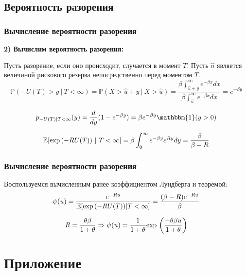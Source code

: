 \documentclass[10pt]{beamer}
\newcommand\Exp{{\rm exp \,}}
\begin{document}
\subsection{Вероятность разорения}
\begin{frame}
\frametitle{Вычисление вероятности разорения}
\textbf{2) Вычислим вероятность разорения:}

Пусть разорение, если оно происходит, случается в момент $T$.
Пусть $\hat{u}$ является величиной рискового резерва непосредственно перед моментом $T$.
\begin{equation}
\mathbb{P}(-U(T)>y\ |\ T < \infty) = \mathbb{P}(X > \hat{u} + y \ | \ X > \hat{u}) =
\frac   {\beta\int_{\hat{u}+y}^{\infty} e^{-\beta x}dx}
        {\beta\int_{\hat{u}}^{\infty}   e^{-\beta x}dx}
                                                        = e^{-\beta y}
\end{equation}

\begin{equation}
p_{-U(T)|T < \infty}(y) = \frac{d}{dy}(1-e^{-\beta y}) = \beta e^{-\beta y} \mathbbm{1}(y > 0)
\end{equation}

\begin{equation}
\mathbb{E}[\Exp(-RU(T)) \ | \ T<\infty] = \beta\int_{0}^{\infty} e^{-\beta y} e^{Ry}dy =
\frac{\beta}{\beta - R}
\end{equation}
\end{frame}


\begin{frame}
\frametitle{Вычисление вероятности разорения}

Воспользуемся вычисленным ранее коэффициентом Лундберга и теоремой:
\begin{equation}
\psi(u) = \frac{e^{-Ru}}{\mathbb{E}[\Exp(-RU(T))|T < \infty]} = \frac{(\beta-R)e^{-Ru}}{\beta}
\end{equation}

\begin{equation}
R = \frac{\theta\beta}{1 + \theta} \Rightarrow
\psi(u) = \frac{1}{1+\theta} \Exp\left(\frac{-\theta\beta u}{1+\theta}\right)
\end{equation}
\end{frame}


\section{Приложение}
\end{document}
